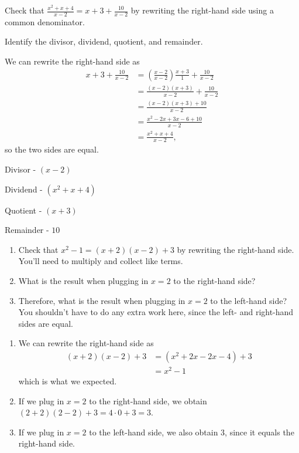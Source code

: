 \documentclass[noauthor]{ximera}
\begin{document}
\begin{problem}
Check that \(\frac{x^2 + x + 4}{x - 2} = x + 3 + \frac{10}{x - 2}\) by
rewriting the right-hand side using a common denominator. 

Identify the divisor, dividend, quotient, and remainder.

\begin{explanation}
We can rewrite the right-hand side as 
\begin{align*}
    x + 3 + \frac{10}{x - 2} & = \left(\frac{x - 2}{x - 2}\right) \frac{x + 3}{1} + \frac{10}{x - 2} \\
    & = \frac{(x - 2)(x + 3)}{x - 2} + \frac{10}{x - 2} \\
    & = \frac{(x - 2)(x + 3) + 10}{x - 2} \\
    & = \frac{x^2 - 2x + 3x - 6 + 10}{x - 2} \\
    & = \frac{x^2 + x + 4}{x - 2},
\end{align*}
so the two sides are equal. 

Divisor - \((x - 2)\)

Dividend - \((x^2 + x + 4)\)

Quotient - \((x + 3)\)

Remainder - \(10\)
\end{explanation}
\end{problem}

\begin{problem}
\begin{enumerate}
    \item Check that \(x^2 - 1 = (x + 2)(x - 2) + 3\) by rewriting the right-hand
    side. You'll need to multiply and collect like terms.
    \item What is the result when plugging in \(x = 2\) to the right-hand side?
    \item Therefore, what is the result when plugging in \(x = 2\) to the left-hand
    side? You shouldn't have to do any extra work here, since the
    left- and right-hand sides are equal.
\end{enumerate}

\begin{explanation}
    \begin{enumerate}
        \item We can rewrite the right-hand side as
        \begin{align*}
            (x + 2)(x - 2) + 3 & = (x^2 + 2x - 2x - 4) + 3 \\
            & = x^2 - 1
        \end{align*}
        which is what we expected.

        \item If we plug in \(x = 2\) to the right-hand side, we obtain \((2 + 2)(2 - 2) + 3 = 4 \cdot 0 + 3 = 3\).
        \item If we plug in \(x = 2\) to the left-hand side, we also obtain 3, since it equals the right-hand side.
    \end{enumerate}
\end{explanation}
\end{problem}
\end{document}
